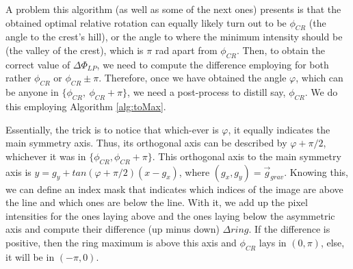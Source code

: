 \documentclass[11pt, a4paper, twoside]{article} %
\begin{document}

 A problem this algorithm (as well as some of the next ones) presents is that the obtained optimal relative rotation can equally likely turn out to be $\phi_{CR}$ (the angle to the crest's hill), or the angle to where the minimum intensity should be (the valley of the crest), which is $\pi$ rad apart from $\phi_{CR}$. Then, to obtain the correct value of $\Delta\Phi_{LP}$, we need to compute the difference employing for both rather $\phi_{CR}$ or $\phi_{CR}\pm\pi$. Therefore, once we have obtained the angle $\varphi$, which can be anyone in $\{\phi_{CR},\ \phi_{CR}+\pi\}$, we need a post-process to distill say, $\phi_{CR}$. We do this employing Algorithm \ref{alg:toMax}.

Essentially, the trick is to notice that which-ever is $\varphi$, it equally indicates the main symmetry axis. Thus, its orthogonal axis can be described by $\varphi+\pi/2$, whichever it was in $\{\phi_{CR},\phi_{CR}+\pi\}$. This orthogonal axis to the main symmetry axis is $y=g_y+tan(\varphi+\pi/2)(x-g_x)$, where $(g_x,g_y)=\vec{g}_{grav}$. Knowing this, we can define an index mask that indicates which indices of the image are above the line and which ones are below the line. With it, we add up the pixel intensities for the ones laying above and the ones laying below the asymmetric axis and compute their difference (up minus down) $\Delta ring$. If the difference is positive, then the ring maximum is above this axis and $\phi_{CR}$ lays in $(0,\pi)$, else, it will be in $(-\pi,0)$.
\end{document}
